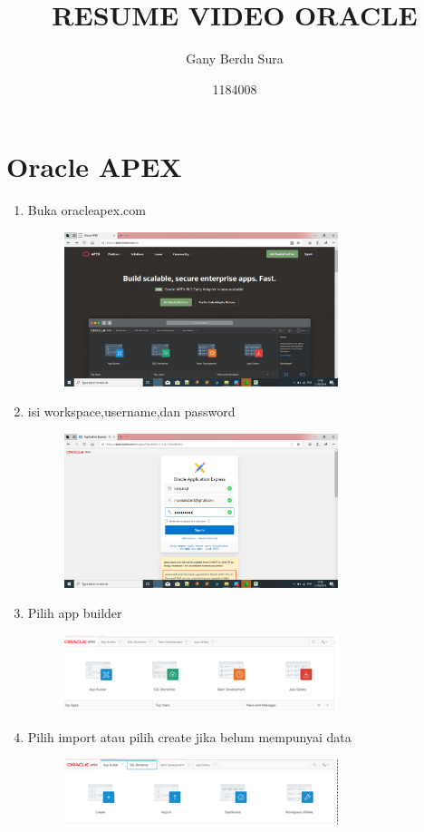 \documentclass{article}
\title{RESUME VIDEO ORACLE}
\author{Gany Berdu Sura}
\date{1184008}
\begin{document}
\maketitle

\section{Oracle APEX}
\begin{enumerate}
\item Buka oracleapex.com
\begin{figure}[h]
\centerline{\includegraphics[width=8cm]{figure/sa.png}}
            \end{figure}
            \item isi workspace,username,dan password
\begin{figure}[h]
\centerline{\includegraphics[width=8cm]{figure/su.png}}
            \end{figure}
\newpage\item Pilih app builder
\begin{figure}[h]
\centerline{\includegraphics[width=8cm]{figure/1.png}}
            \end{figure}
            \item Pilih import atau pilih create jika belum mempunyai data
\begin{figure}[h]
\centerline{\includegraphics[width=8cm]{figure/2.png}}

\end{figure}
\end{enumerate}
\end{document}
